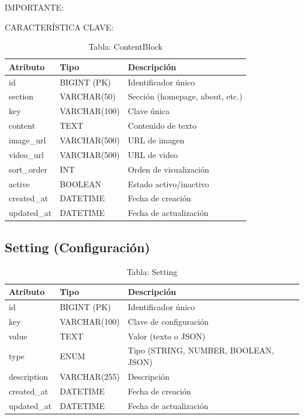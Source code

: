 \documentclass[12pt,a4paper,oneside]{book}
\begin{document}
\begin{alert}{IMPORTANTE:}
\begin{info}{CARACTERÍSTICA CLAVE:}
\begin{table}[ht]
    \centering
    \caption{Tabla: ContentBlock}
    \begin{tabular}{@{}lll@{}}
        \toprule
        \textbf{Atributo} & \textbf{Tipo} & \textbf{Descripción} \\
        \midrule
        id & BIGINT (PK) & Identificador único \\
        section & VARCHAR(50) & Sección (homepage, about, etc.) \\
        key & VARCHAR(100) & Clave única \\
        content & TEXT & Contenido de texto \\
        image\_url & VARCHAR(500) & URL de imagen \\
        video\_url & VARCHAR(500) & URL de video \\
        sort\_order & INT & Orden de visualización \\
        active & BOOLEAN & Estado activo/inactivo \\
        created\_at & DATETIME & Fecha de creación \\
        updated\_at & DATETIME & Fecha de actualización \\
        \bottomrule
    \end{tabular}
\end{table}

\subsection{Setting (Configuración)}
\label{sec:setting}

\begin{table}[ht]
    \centering
    \caption{Tabla: Setting}
    \begin{tabular}{@{}lll@{}}
        \toprule
        \textbf{Atributo} & \textbf{Tipo} & \textbf{Descripción} \\
        \midrule
        id & BIGINT (PK) & Identificador único \\
        key & VARCHAR(100) & Clave de configuración \\
        value & TEXT & Valor (texto o JSON) \\
        type & ENUM & Tipo (STRING, NUMBER, BOOLEAN, JSON) \\
        description & VARCHAR(255) & Descripción \\
        created\_at & DATETIME & Fecha de creación \\
        updated\_at & DATETIME & Fecha de actualización \\
        \bottomrule
    \end{tabular}
\end{table}


\end{info}
\end{alert}
\end{document}
